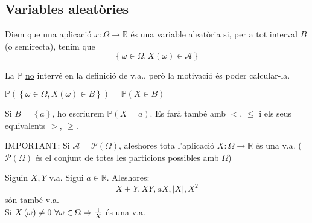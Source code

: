 \documentclass[../main.tex]{subfiles}
\begin{document}
    \subsection{Variables aleatòries}
    \begin{definicio}
        Diem que una aplicació $x: \Omega \to \mathbb{R}$ és una variable aleatòria si, per a tot
        interval $B$ (o semirecta), tenim que
        \begin{displaymath}
            \left\{\omega \in \Omega, X\left(\omega\right) \in \mathcal{A}\right\}
        \end{displaymath}
    \end{definicio}
    \begin{obs}
        La $\mathbb{P}$ \underline{no} intervé en la definició de v.a., però la motivació és poder
        calcular-la.
    \end{obs}
    \begin{notacio}
        $\mathbb{P}\left(\left\{\omega \in \Omega, X\left(\omega\right) \in B\right\} \right) = \mathbb{P}\left(X \in B\right)$  
    \end{notacio}
    \begin{notacio}
        Si $B = \left\{a\right\}$, ho escriurem $\mathbb{P}\left(X=a\right)$. Es farà també amb $<$,
        $\leq$ i els seus equivalents $>$, $\geq$.
    \end{notacio}
    \begin{obs}
        IMPORTANT: Si $\mathcal{A} = \mathcal{P}\left(\Omega\right)$, aleshores tota l'aplicació $X: \Omega \to \mathbb{R}$
        és una v.a. ($\mathcal{P}\left(\Omega\right)$ és el conjunt de totes les particions possibles amb $\Omega$)
    \end{obs}
    \begin{proposicio}
        Siguin $X, Y$ v.a. Sigui $a \in \mathbb{R}$. Aleshores:
        \begin{displaymath}
            X+Y, XY, aX, |X|, X^2
        \end{displaymath}
        són també v.a.\\
        Si $X\left(\omega\right) \neq 0 \hbox{ }\forall \omega \in \Omega \Rightarrow \frac{1}{X}$ és una v.a.
    \end{proposicio}
\end{document}
